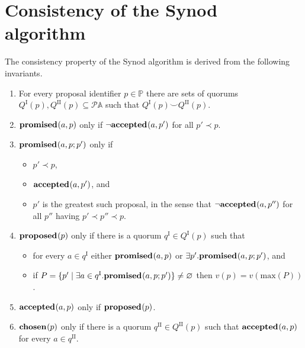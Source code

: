 \documentclass[journal]{IEEEtran}
\begin{document}
%


\appendices
\section{Consistency of the Synod algorithm}
\label{synod-safety}

The consistency property of the Synod algorithm is derived from the following
invariants.

\begin{enumerate}

\item \label{synod-quorums} For every proposal identifier $p \in \mathbb P$
there are sets of quorums $Q^\textrm{I}(p), Q^\textrm{II}(p) \subseteq
\mathcal P \mathbb A$ such that $Q^\textrm{I}(p) \smile Q^\textrm{II}(p)$.

\item \label{synod-fprom} $\mathbf{promised}_{}(a,p)$ only if $\neg\mathbf{accepted}_{}(a,p')$ for all
$p' \prec p$.

\item \label{synod-bprom} $\mathbf{promised}_{}(a,p;p')$ only if
\begin{itemize}
\item $p' \prec p$,
\item $\mathbf{accepted}_{}(a,p')$, and
\item $p'$ is the greatest such proposal, in the sense that
$\neg\mathbf{accepted}_{}(a,p'')$ for all $p''$ having $p' \prec p'' \prec p$.
\end{itemize}

\item \label{synod-prop} $\mathbf{proposed}_{}(p)$ only if there is a quorum $q^\textrm{I}
\in Q^\textrm{I}(p)$ such that
\begin{itemize}
\item for every $a \in q^\textrm{I}$ either $\mathbf{promised}_{}(a,p)$ or $\exists p'.
\mathbf{promised}_{}(a,p;p')$, and
\item if $P = \{ p' \mid \exists a \in q^\textrm{I}. \mathbf{promised}_{}(a,p;p') \}
\ne \varnothing$ then $v(p) = v(\mathrm{max}(P))$.
\end{itemize}

\item \label{synod-acc} $\mathbf{accepted}_{}(a,p)$ only if $\mathbf{proposed}_{}(p)$.

\item \label{synod-chosen} $\mathbf{chosen}_{}(p)$ only if there is a quorum
$q^\textrm{II} \in Q^\textrm{II}(p)$ such that $\mathbf{accepted}_{}(a,p)$ for every $a \in
q^\textrm{II}$.

\end{enumerate}
\end{document}
